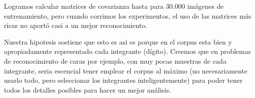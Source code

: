 Logramos calcular matrices de covarianza hasta para 30.000 im\'agenes de entrenamiento, pero cuando
corrimos los experimentos, el uso de las matrices m\'as ricas no aport\'o casi a un mejor reconocimiento.

Nuestra hipotesis sostiene que esto es asi es porque en el corpus esta bien y apropiadamente
representado cada integrante (d\'igito). Creemos que en problemas de reconocimiento de caras por ejemplo, con
muy pocas muestras de cada integrante, seria escencial tener emplear el corpus al m\'aximo (no necesariamente
usarlo todo, pero seleccionar los integrantes inteligentemente) para poder tener todos los detalles
posibles para hacer un mejor an\'alisis.
